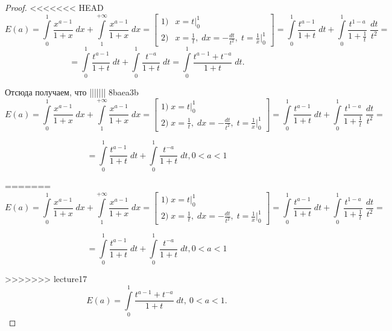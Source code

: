 \documentclass[../../main.tex]{subfiles}
\begin{document}
	\begin{proof}
<<<<<<< HEAD
		\[  E(a) =  \int\limits_{0}^{1}  \frac{x^{a-1}}{1+x} \; dx + 
		\int\limits_{1}^{+\infty} \frac{x^{a-1}}{1+x} \; dx  = \left[  
		\begin{array}{ll}
    1)& x = t \big|_{0}^{1} \\
		2)& \displaystyle x = \frac{1}{t}, \; dx = - \frac{dt}{t^2}, \; t = 
		\frac{1}{x} 
		\bigg|_{0}^{1}
		\end{array}  \right] = \int\limits_{0}^{1} \frac{t^{a-1}}{1+t} \; dt + 
		\int\limits_{0}^{1} \frac{t^{1-a}}{1+\frac{1}{t}} \; \frac{dt}{t^2} =      \]
		\[  = \int\limits_{0}^{1} \frac{t^{a-1}}{1+t} \; dt +  \int\limits_{0}^{1} 
		\frac{t^{-a}}{1+t} \; dt = \int\limits_{0}^{1}  \frac{t^{a-1} + t^{-a}}{1+t} 
		\; dt.\]
		
		Отсюда получаем, что
||||||| 8baea3b
		\[  E(a) =  \int\limits_{0}^{1}  \frac{x^{a-1}}{1+x} \; dx + \int\limits_{1}^{+\infty} \frac{x^{a-1}}{1+x} \; dx  = \left[  \begin{gathered}
	    1) \; x = t \bigg|_{0}^{1} \\
		2) \; 	x = \frac{1}{t}, \; dx = - \frac{dt}{t^2}, \; t = \frac{1}{x}  \bigg|_{0}^{1}
		\end{gathered}  \right] = \int\limits_{0}^{1} \frac{t^{a-1}}{1+t} \; dt + \int\limits_{0}^{1} \frac{t^{1-a}}{1+\frac{1}{t}} \; \frac{dt}{t^2} =      \]
		
		\[  = \int\limits_{0}^{1} \frac{t^{a-1}}{1+t} \; dt +  \int\limits_{0}^{1} \frac{t^{-a}}{1+t} \; dt, 0<a<1       \]
		
=======
		\[  E(a) =  \int\limits_{0}^{1}  \frac{x^{a-1}}{1+x} \; dx + 
		\int\limits_{1}^{+\infty} \frac{x^{a-1}}{1+x} \; dx  = \left[  
		\begin{gathered}
	    1) \; x = t \bigg|_{0}^{1} \\
		2) \; 	x = \frac{1}{t}, \; dx = - \frac{dt}{t^2}, \; t = \frac{1}{x}  
		\bigg|_{0}^{1}
		\end{gathered}  \right] = \int\limits_{0}^{1} \frac{t^{a-1}}{1+t} \; dt + 
		\int\limits_{0}^{1} \frac{t^{1-a}}{1+\frac{1}{t}} \; \frac{dt}{t^2} =      \]
		
		\[  = \int\limits_{0}^{1} \frac{t^{a-1}}{1+t} \; dt +  \int\limits_{0}^{1} 
		\frac{t^{-a}}{1+t} \; dt, 0<a<1       \]
		
>>>>>>> lecture17
		\begin{equation}
		\label{14:17}
		  E(a) = \int\limits_{0}^{1}  \frac{t^{a-1} + t^{-a}}{1+t} \; dt,\ 0<a<1.
		\end{equation}
		

\end{proof}
\end{document}
